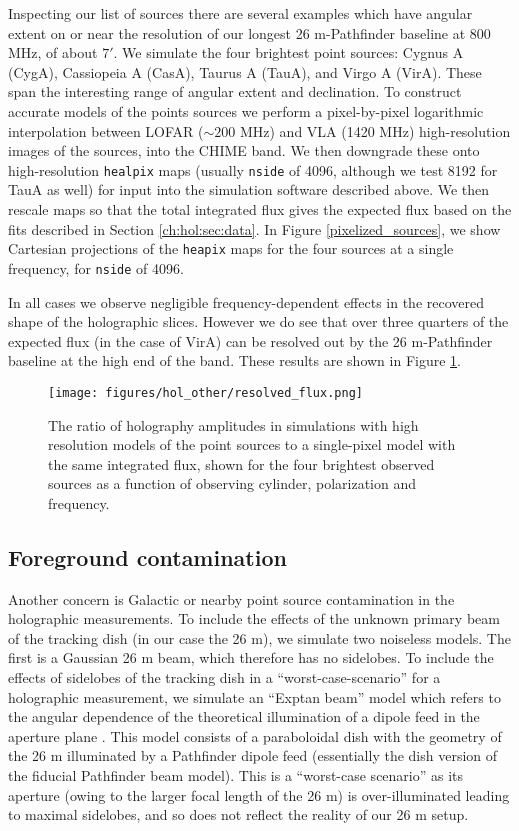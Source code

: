 Inspecting our list of sources there are several examples which have angular extent on or near the resolution of our longest 26 m-Pathfinder baseline at 800 MHz, of about $7'$. We simulate the four brightest point sources: Cygnus A (CygA), Cassiopeia A (CasA), Taurus A (TauA), and Virgo A (VirA). These span the interesting range of angular extent and declination. To construct accurate models of the points sources we perform a pixel-by-pixel logarithmic interpolation between LOFAR ($\sim 200$ MHz) and VLA (1420 MHz) high-resolution images of the sources, into the CHIME band. We then downgrade these onto high-resolution \texttt{healpix} maps (usually \texttt{nside} of 4096, although we test 8192 for TauA as well) for input into the simulation software described above. We then rescale maps so that the total integrated flux gives the expected flux based on the fits described in Section \ref{ch:hol:sec:data}. In Figure \ref{pixelized_sources}, we show Cartesian projections of the \texttt{heapix} maps for the four sources at a single frequency, for \texttt{nside} of 4096.

In all cases we observe negligible frequency-dependent effects in the recovered shape of the holographic slices. However we do see that over three quarters of the expected flux (in the case of VirA) can be resolved out by the 26 m-Pathfinder baseline at the high end of the band. These results are shown in Figure \ref{resolved_flux}.

\begin{figure}[h!]
\begin{center}
\texttt{[image: figures/hol\_other/resolved\_flux.png]}
\caption{The ratio of holography amplitudes in simulations with high resolution models of the point sources to a single-pixel model with the same integrated flux, shown for the four brightest observed sources as a function of observing cylinder, polarization and frequency.}
\label{resolved_flux}
\end{center}
\end{figure} 

\subsection{Foreground contamination}
Another concern is Galactic or nearby point source contamination in the holographic measurements. To include the effects of the unknown primary beam of the tracking dish (in our case the 26 m), we simulate two noiseless models. The first is a Gaussian 26 m beam, which therefore has no sidelobes. To include the effects of sidelobes of the tracking dish in a ``worst-case-scenario'' for a holographic measurement, we simulate an ``Exptan beam'' model which refers to the angular dependence of the theoretical illumination of a dipole feed in the aperture plane \citep{mmodes2}. This model consists of a paraboloidal dish with the geometry of the 26 m illuminated by a Pathfinder dipole feed (essentially the dish version of the fiducial Pathfinder beam model). This is a ``worst-case scenario'' as its aperture (owing to the larger focal length of the 26 m) is over-illuminated leading to maximal sidelobes, and so does not reflect the reality of our 26 m setup.

